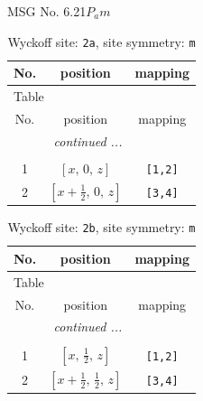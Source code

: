 \documentclass[fleqn,8pt]{jsarticle}
\begin{document}
\setcounter{MaxMatrixCols}{32}

\renewcommand{\tablename}{Table~}
\renewcommand{\figurename}{Figure~}
\begin{center}
\LARGE
MSG No. 6.21\quad$P_{a}m$
\end{center}
\renewcommand{\arraystretch}{1.2}
\begin{longtable}{ccc}
\caption{Wyckoff site: {\tt 2a}, site symmetry: {\tt m}}
 \\
 \hline \hline
No. & position & mapping \\ \hline \endfirsthead

\multicolumn{2}{l}{\tablename\ \thetable{}} \\
 \hline \hline
No. & position & mapping \\ \hline \endhead

 \hline \hline
\multicolumn{2}{r}{\footnotesize\it continued ...} \\ \endfoot

 \hline \hline
\multicolumn{2}{r}{} \\ \endlastfoot

1 & $\left[ x,\, 0,\, z \right]$ & {\tt [1,2]} \\ \hline
2 & $\left[ x + \frac{1}{2},\, 0,\, z \right]$ & {\tt [3,4]} \\
\end{longtable}
\renewcommand{\arraystretch}{1.2}
\begin{longtable}{ccc}
\caption{Wyckoff site: {\tt 2b}, site symmetry: {\tt m}}
 \\
 \hline \hline
No. & position & mapping \\ \hline \endfirsthead

\multicolumn{2}{l}{\tablename\ \thetable{}} \\
 \hline \hline
No. & position & mapping \\ \hline \endhead

 \hline \hline
\multicolumn{2}{r}{\footnotesize\it continued ...} \\ \endfoot

 \hline \hline
\multicolumn{2}{r}{} \\ \endlastfoot

1 & $\left[ x,\, \frac{1}{2},\, z \right]$ & {\tt [1,2]} \\ \hline
2 & $\left[ x + \frac{1}{2},\, \frac{1}{2},\, z \right]$ & {\tt [3,4]} \\
\end{longtable}
\renewcommand{\arraystretch}{1.2}
\end{document}

